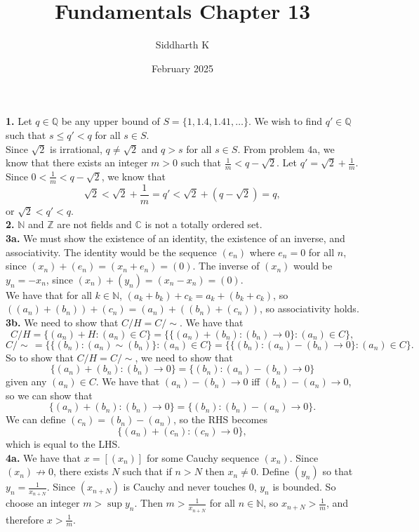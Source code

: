 \documentclass{article}
\title{Fundamentals Chapter 13}
\author{Siddharth K}
\date{February 2025}
\newcommand{\N}{\mathbb{N}}
\newcommand{\Z}{\mathbb{Z}}
\newcommand{\Q}{\mathbb{Q}}
\newcommand{\C}{\mathbb{C}}
\begin{document}
\maketitle

\textbf{1.} Let $q \in \Q$ be any upper bound of $S = \{1, 1.4, 1.41, \ldots\}$. We wish to find $q' \in \Q$ such that $s \le q' < q$ for all $s \in S$. \\

Since $\sqrt{2}$ is irrational, $q \neq \sqrt{2}$ and $q > s$ for all $s \in S$. From problem 4a, we know that there exists an integer $m > 0$ such that $\frac{1}{m} < q - \sqrt{2}$. Let $q' = \sqrt{2} + \frac{1}{m}$. Since $0 < \frac{1}{m} < q - \sqrt{2}$, we know that
$$\sqrt{2} < \sqrt{2} + \frac{1}{m} = q' < \sqrt{2} + (q - \sqrt{2}) = q,$$
or $\sqrt{2} < q' < q$. \\

\textbf{2.} $\N$ and $\Z$ are not fields and $\C$ is not a totally ordered set. \\

\textbf{3a.} We must show the existence of an identity, the existence of an inverse, and associativity. The identity would be the sequence 
$(e_n)$ where $e_n = 0$ for all $n$, since $(x_n) + (e_n) = (x_n + e_n) = (0)$. The inverse of $(x_n)$ would be $y_n = -x_n$, since $(x_n) + (y_n) = (x_n - x_n) = (0)$. \\

We have that for all $k \in \N$, $(a_k + b_k) + c_k = a_k + (b_k + c_k)$, so $((a_n) + (b_n)) + (c_n) = (a_n) + ((b_n) + (c_n))$, so associativity holds. \\

\textbf{3b.} We need to show that $C/H = C/\sim$. We have that
$$C/H = \{(a_n) + H : (a_n) \in C\} = \{\{(a_n) + (b_n) : (b_n) \to 0\} : (a_n) \in C\},$$
$$C/\sim\, = \{\{(b_n) : (a_n) \sim (b_n)\} : (a_n) \in C\} = \{\{(b_n) : (a_n) - (b_n) \to 0\} : (a_n) \in C\}.$$
So to show that $C/H = C/\sim$, we need to show that
$$\{(a_n) + (b_n) : (b_n) \to 0\} = \{(b_n) : (a_n) - (b_n) \to 0\}$$
given any $(a_n) \in C$. We have that $(a_n) - (b_n) \to 0$ iff $(b_n) - (a_n) \to 0$, so we can show that
$$\{(a_n) + (b_n) : (b_n) \to 0\} = \{(b_n) : (b_n) - (a_n) \to 0\}.$$
We can define $(c_n) = (b_n) - (a_n)$, so the RHS becomes
$$\{(a_n) + (c_n) : (c_n) \to 0\},$$
which is equal to the LHS. \\

\textbf{4a.} We have that $x = [(x_n)]$ for some Cauchy sequence $(x_n)$. Since $(x_n) \not \to 0$, there exists $N$ such that if $n > N$ then $x_n \neq 0$. Define $(y_n)$ so that $y_n = \frac{1}{x_{n + N}}$. Since $(x_{n + N})$ is Cauchy and never touches $0$, $y_n$ is bounded. So choose an integer $m > \sup y_n$. Then $m > \frac{1}{x_{n + N}}$ for all $n \in \N$, so $x_{n + N} > \frac{1}{m}$, and therefore $x > \frac{1}{m}$. \\
\end{document}

